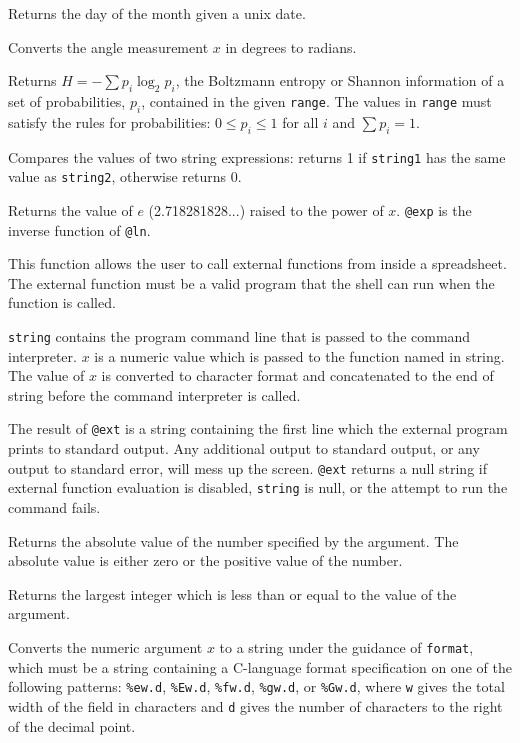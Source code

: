 \documentclass[titlepage]{article}
\begin{document}
 Returns the day of the month given a unix date.

 Converts the angle measurement $x$ in degrees to
radians.

 Returns $H = -\sum p_i \log_2 p_i$, the
Boltzmann entropy or Shannon information of a set of probabilities,
$p_i$, contained in the given \texttt{range}.  The values in
\texttt{range} must satisfy the rules for probabilities: $0 \le p_i
\le 1$ for all $i$ and $\sum p_i = 1$.

 Compares the values of two string
expressions: returns 1 if \texttt{string1} has the same value as
\texttt{string2}, otherwise returns 0.

 Returns the value of $e$ (2.718281828...) raised to
the power of $x$.  \texttt{@exp} is the inverse function of
\texttt{@ln}.

 This function allows the user to call
external functions from inside a spreadsheet.  The external function
must be a valid program that the shell can run when the function is
called.

\texttt{string} contains the program command line that is passed to the 
command interpreter.  $x$ is a numeric value which is passed to the
function named in string.  The value of $x$ is converted to character
format and concatenated to the end of string before the command
interpreter is called.

The result of \texttt{@ext} is a string containing the first line
which the external program prints to standard output.  Any additional
output to standard output, or any output to standard error, will mess
up the screen.  \texttt{@ext} returns a null string if external
function evaluation is disabled, \texttt{string} is null, or the
attempt to run the command fails.

 Returns the absolute value of the number specified
by the argument.  The absolute value is either zero or the positive
value of the number.

 Returns the largest integer which is less than or
equal to the value of the argument.

 Converts the numeric argument $x$ to a string
under the guidance of \texttt{format}, which must be a string
containing a C-language format specification on one of the following
patterns: \texttt{\%ew.d}, \texttt{\%Ew.d}, \texttt{\%fw.d},
\texttt{\%gw.d}, or \texttt{\%Gw.d}, where \texttt{w} gives the total
width of the field in characters and \texttt{d} gives the number of
characters to the right of the decimal point.
\end{document}
